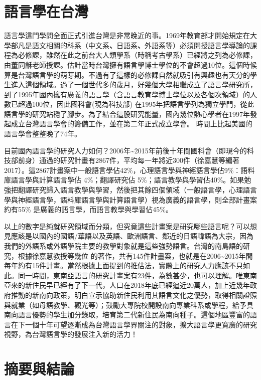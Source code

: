 \section{語言學在台灣} %

語言學這門學問全面正式引進台灣是非常晚近的事。1969年教育部才開始規定在大學部凡是語文相關的科系（中文系\textbf{、}日語系\textbf{、}外語系等）必須開授語言學導論的課程為必修課，雖然在此之前台大人類學系（時稱考古學系）已經將之列為必修課，由董同龢老師授課。估計當時台灣擁有語言學博士學位的不會超過10位。這個時候算是台灣語言學的萌芽期。不過有了這樣的必修課自然就吸引有興趣也有天分的學生進入這個領域。過了一個世代多的歲月，好幾個大學相繼成立了語言學研究所，到了1995年國內擁有廣義的語言學（含語言教育學博士學位以及各個次領域）的人數已超過100位，因此國科會(現為科技部) 在1995年把語言學列為獨立學門，從此語言學的研究站穩了腳步。為了結合這股研究能量，國內幾位熱心學者在1997年發起成立台灣語言學會的籌備工作，並在第二年正式成立學會。 時間上比起美國的語言學會整整晚了74年。

目前國內語言學的研究人力如何？2006年{\textasciitilde}2015年前後十年間國科會（即現今的科技部前身）通過的研究計畫有2867件，平均每一年將近300件（徐嘉慧等編著2017）。這2867計畫案中一般語言學佔42\%，心理語言學與神經語言學佔9\%：語料庫語言學與計算語言學佔 4\%；翻譯研究佔 5\%；語言教學與學習佔40\%。如果勉強把翻譯研究歸入語言教學與學習，然後把其餘四個領域（一般語言學，心理語言學與神經語言學，語料庫語言學與計算語言學）視為廣義的語言學，則全部計畫案約有55\% 是廣義的語言學，而語言教學與學習佔45\%。

以上的數字是純就研究領域而分類，但究竟這些計畫案是研究哪些語言呢？可以想見應該是以國內的國語/華語以及英語、歐洲語言、鄰近的日語韓語為大宗，因為我們的外語系或外語學院主要的教學對象就是這些強勢語言。台灣的南島語的研究，根據徐嘉慧教授等幾位  的著作，共有145件計畫案，也就是在2006{\textasciitilde}2015年間每年約有15件計畫。當然根據上面提到的推估法，實際上的研究人力應該不只如此。同一時間，東南亞語言的研究計畫案有23件，為數甚少，也可以理解。唯東南亞來的新住民早已經有了下一代，人口在2018年底已經逼近20萬人，加上近幾年政府推動的新南向政策，明白宣示協助新住民利用其語言文化之優勢，取得相關證照與就業（如母語教學、觀光等）；鼓勵大專院校開設南向專業科系或學程，給予具南向語言優勢的學生加分錄取，培育第二代新住民為南向種子。這個地區豐富的語言在下一個十年可望逐漸成為台灣語言學界關注的對象，擴大語言學更寬廣的研究視野，為台灣語言學的發展注入新的活力！

\section{摘要與結論} %

